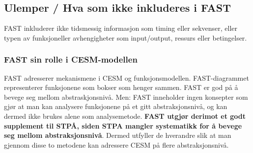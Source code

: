 \subsection{Ulemper / Hva som ikke inkluderes i FAST}

FAST inkluderer ikke tidsmessig informasjon som timing eller sekvenser, eller typen av funksjoneller avhengigheter som input/output, ressurs eller betingelser.

\subsubsection{FAST sin rolle i CESM-modellen}

FAST adresserer mekanismene i CESM og funksjonsmodellen. FAST-diagrammet representerer funksjonene som bokser som henger sammen. FAST er god på å bevege seg mellom abstraskjonsnivå. Men: FAST inneholder ingen konsepter som gjør at man kan analysere funksjonene på et gitt abstraksjonsnivå, og kan dermed ikke brukes alene som analysemetode. \textbf{FAST utgjør derimot et godt supplement til STPÅ, siden STPA mangler systematikk for å bevege seg mellom abstraksjonsnivå}. Dermed utfyller de hverandre slik at man gjennom disse to metodene kan adressere CESM på flere abstraksjonsnivå. 